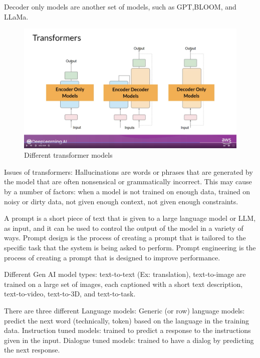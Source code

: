 \documentclass[12pt]{report}
\begin{document}
Decoder only models are another set of models, such as GPT,BLOOM, and LLaMa.


\begin{figure}[H]
  \centering
  \caption{Different transformer models}
  \includegraphics[trim=3cm 7cm 5cm 0cm,clip,scale=0.15]{pics/VariousTransformers.png}
\end{figure}


Issues of transformers: Hallucinations are words or phrases that are generated by the model that are often nonsensical or grammatically incorrect. This may cause by a number of factors: when a model is not trained on enough data, trained on noisy or dirty data, not given enough context, not given enough constraints.


A prompt is a short piece of text that is given to a large language model or LLM, as input, and it can be used to control the output of the model in a variety of ways. Prompt design is the process of creating a prompt that is tailored to the specific task that the system is being asked to perform. Prompt engineering is the process of creating a prompt that is designed to improve performance.


Different Gen AI model types: text-to-text (Ex: translation), text-to-image are trained on a large set of images, each captioned with a short text description, text-to-video, text-to-3D, and text-to-task.


There are three different Language models: Generic (or row) language models: predict the next word (technically, token) based on the language in the training data. Instruction tuned models: trained to predict a response to the instructions given in the input. Dialogue tuned models: trained to have a dialog by predicting the next response.
\end{document}
